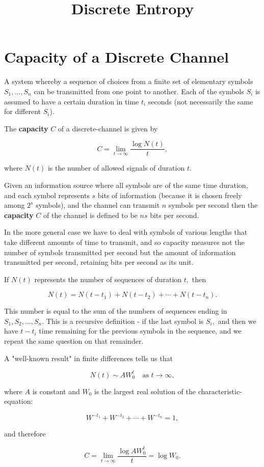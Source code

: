 \documentclass{article}
\title{Discrete Entropy}
\begin{document}
\section{Capacity of a Discrete Channel}

\begin{definition}
A system whereby a \@{sequence} of choices from a \@{finite} \@{set} of elementary symbols $S_1, \dots, S_n$ can be transmitted from one point to another. Each of the symbols $S_i$ is assumed to have a certain duration in time $t_i$ seconds (not necessarily the same for different $S_i$).
\end{definition}

\begin{definition}[Capacity]
The \textbf{capacity} $C$ of a \@{discrete-channel} is given by

\[ C = \lim_{t \to \infty} \frac{\log{N(t)}}{t}, \]

where $N(t)$ is the number of allowed \@{signals} of duration $t.$
\end{definition}

\begin{note}
Given an information source where all symbols are of the same time duration, and each symbol represents $s$ bits of information (because it is chosen freely among $2^s$ symbols), and the channel can transmit $n$ symbols per second then the \textbf{\@{capacity}} $C$ of the channel is defined to be $ns$ bits per second.

In the more general case we have to deal with symbols of various lengths that take different amounts of time to transmit, and so capacity measures not the number of symbols transmitted per second but the amount of information transmitted per second, retaining bits per second as its unit.

If $N(t)$ represents the number of \@{sequences} of duration $t,$ then

\[ N(t) = N(t - t_1) + N(t - t_2) + \cdots + N(t - t_n). \]

This number is equal to the sum of the numbers of sequences ending in $S_1, S_2, \dots, S_n.$ This is a recursive definition - if the last symbol is $S_i,$ and then we have $t - t_i$ time remaining for the previous symbols in the sequence, and we repeat the same question on that remainder.

A "well-known result" in finite differences tells us that

\[ N(t) \sim A W_0^t \quad \text{as } t \to \infty, \]

where $A$ is constant and $W_0$ is the largest real solution of the \@{characteristic-equation}:

\[ W^{-t_1} + W^{-t_2} + \cdots + W^{-t_n} = 1, \]

and therefore 

\[ C = \lim_{t \to \infty} \frac{\log{A W_0^t}}{t} = \log{W_0}. \]
\end{note}
\end{document}
